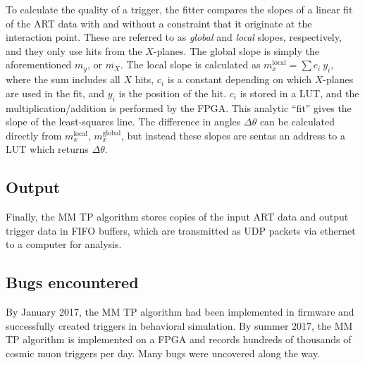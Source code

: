 To calculate the quality of a trigger, the fitter compares the slopes of a linear fit of the ART data with and without a constraint that it originate at the interaction point. These are referred to as \textit{global} and \textit{local} slopes, respectively, and they only use hits from the $X$-planes. The global slope is simply the aforementioned $m_y$, or $\overline{m_X}$. The local slope is calculated as $m_x^\text{local} = \sum c_i \ y_i$, where the sum includes all $X$ hits, $c_i$ is a constant depending on which $X$-planes are used in the fit, and $y_i$ is the position of the hit. $c_i$ is stored in a LUT, and the multiplication/addition is performed by the FPGA. This analytic ``fit'' gives the slope of the least-squares line. The difference in angles $\Delta\theta$ can be calculated directly from $m_x^\text{local}$, $m_x^\text{global}$, but instead these slopes are sentas an address to a LUT which returns $\Delta\theta$.

\subsection{Output}
\label{sec:alg-output}

Finally, the MM TP algorithm stores copies of the input ART data and output trigger data in FIFO buffers, which are transmitted as UDP packets via ethernet to a computer for analysis.

\subsection{Bugs encountered}
\label{sec:alg-bugs}

By January 2017, the MM TP algorithm had been implemented in firmware and successfully created triggers in behavioral simulation. By summer 2017, the MM TP algorithm is implemented on a FPGA and records hundreds of thousands of cosmic muon triggers per day. Many bugs were uncovered along the way.


